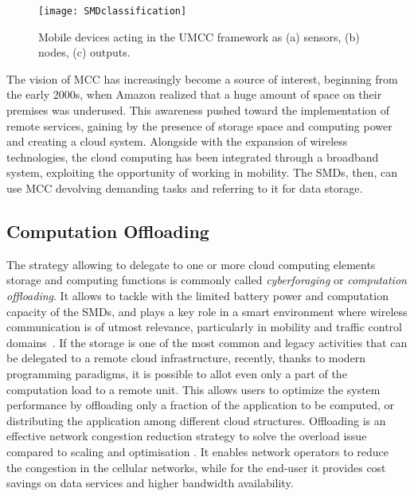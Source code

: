 \documentclass[twoside,openright]{report}
\begin{document}
\begin{figure}[tbp]
\centering
\texttt{[image: SMDclassification]}
\caption{Mobile devices acting in the UMCC framework as (a) sensors, (b) nodes, (c) outputs.}
\label{fig:SMDclassification}
\end{figure}

The vision of \gls{MCC} has increasingly become a source of interest, beginning from the early 2000s, when Amazon realized that a huge amount of space on their premises was underused. 
This awareness pushed toward the implementation of remote services, gaining by the presence of storage space and computing power and creating a cloud system. 
Alongside with the expansion of wireless technologies, the cloud computing has been integrated through a broadband system, exploiting the opportunity of working in mobility. 
The \glspl{SMD}, then, can use \gls{MCC} devolving demanding tasks and referring to it for data storage.  
\subsection*{Computation Offloading} 
The strategy allowing to delegate to one or more cloud computing elements storage and computing functions is commonly called \emph{cyberforaging} or \emph{computation offloading}. It allows to tackle with the limited battery power and computation capacity of the \glspl{SMD}, and plays a key role in a smart environment where wireless communication is of utmost relevance, particularly in mobility and traffic control domains~\cite{Barbarossa2014}.
If the storage is one of the most common and legacy activities that can be delegated to a remote cloud infrastructure, recently, thanks to modern programming paradigms, it is possible to allot even only a part of the computation load to a remote unit. 
This allows users to optimize the system performance by offloading only a fraction of the application to be computed, or distributing the application among different cloud structures. 
Offloading is an effective network congestion reduction strategy to solve the overload issue compared to scaling and optimisation \cite{Juniper}. It enables network operators to reduce the congestion in the cellular networks, while for the end-user it provides cost savings on data services and higher bandwidth availability.   
\end{document}

